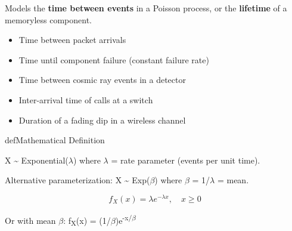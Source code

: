 \begin{Shaded}
\begin{Highlighting}[]
\NormalTok{(}\OperatorTok{,}\NormalTok{ (}\OperatorTok{+}\NormalTok{)}\OperatorTok{/}\OperatorTok{,} \NormalTok{(}\NormalTok{))}\OperatorTok{;}
\NormalTok{(}\OperatorTok{,}\NormalTok{ (}\OperatorTok{{-}}\NormalTok{)}\OperatorTok{\^{}}\OperatorTok{/}\OperatorTok{,} \NormalTok{(}\NormalTok{))}\OperatorTok{;}
\end{Highlighting}
\end{Shaded}



Models the \textbf{time between events} in a Poisson process, or the \textbf{lifetime} of a memoryless component.


\begin{itemize}
\tightlist
\item
  Time between packet arrivals
\item
  Time until component failure (constant failure rate)
\item
  Time between cosmic ray events in a detector
\item
  Inter-arrival time of calls at a switch
\item
  Duration of a fading dip in a wireless channel
\end{itemize}

\begin{PSbox}[unbreakable]{def}{Mathematical Definition}

X \textasciitilde{} Exponential(\ensuremath{\lambda}) where \ensuremath{\lambda} = rate parameter (events per unit time).

Alternative parameterization: X \textasciitilde{} Exp(\ensuremath{\beta}) where \ensuremath{\beta} = 1/\ensuremath{\lambda} = mean.

\end{PSbox}


\[f_X(x) = \lambda e^{-\lambda x}, \quad x \geq 0\]

Or with mean \ensuremath{\beta}: f\textsubscript{X}(x) = (1/\ensuremath{\beta})e\textsuperscript{-x/\ensuremath{\beta}}

